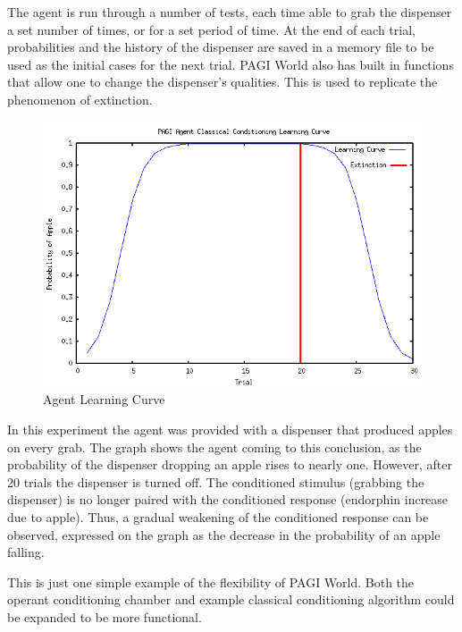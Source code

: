 The agent is run through a number of tests, each time able to grab the dispenser a set number of times, or for a set period of time.  At the end of each trial, probabilities and the history of the dispenser are saved in a memory file to be used as the initial cases for the next trial.  PAGI World also has built in functions that allow one to change the dispenser's qualities.  This is used to replicate the phenomenon of extinction. %


\begin{figure}[h]
\centering
\includegraphics[scale=0.5]{cc_graph}
\caption{Agent Learning Curve}
\end{figure}

In this experiment the agent was provided with a dispenser that produced apples on every grab.  The graph shows the agent coming to this conclusion, as the probability of the dispenser dropping an apple rises to nearly one.  However, after 20 trials the dispenser is turned off.  The conditioned stimulus (grabbing the dispenser) is no longer paired with the conditioned response (endorphin increase due to apple).  Thus, a gradual weakening of the conditioned response can be observed, expressed on the graph as the decrease in the probability of an apple falling.  

This is just one simple example of the flexibility of PAGI World.  Both the operant conditioning chamber and example classical conditioning algorithm could be expanded to be more functional. %